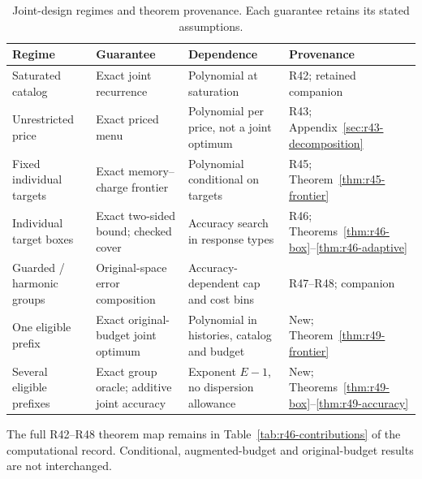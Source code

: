 \begin{table}[p]\centering
\caption{Joint-design regimes and theorem provenance. Each guarantee retains its stated assumptions.}\label{tab:r49-complexity}
\setlength{\tabcolsep}{3pt}
\begin{tabular}{p{}p{}p{}p{}}\toprule
Regime & Guarantee & Dependence & Provenance \\
\midrule
Saturated catalog & Exact joint recurrence & Polynomial at saturation & R42; retained companion \\
Unrestricted price & Exact priced menu & Polynomial per price, not a joint optimum & R43; Appendix~\ref{sec:r43-decomposition} \\
Fixed individual targets & Exact memory--charge frontier & Polynomial conditional on targets & R45; Theorem~\ref{thm:r45-frontier} \\
Individual target boxes & Exact two-sided bound; checked cover & Accuracy search in response types & R46; Theorems~\ref{thm:r46-box}--\ref{thm:r46-adaptive} \\
Guarded / harmonic groups & Original-space error composition & Accuracy-dependent cap and cost bins & R47--R48; companion \\
One eligible prefix & Exact original-budget joint optimum & Polynomial in histories, catalog and budget & New; Theorem~\ref{thm:r49-frontier} \\
Several eligible prefixes & Exact group oracle; additive joint accuracy & Exponent $E-1$, no dispersion allowance & New; Theorems~\ref{thm:r49-box}--\ref{thm:r49-accuracy} \\
\bottomrule\end{tabular}
\par\smallskip\begin{minipage}{.98\textwidth}The full R42--R48 theorem map remains in Table~\ref{tab:r46-contributions} of the computational record. Conditional, augmented-budget and original-budget results are not interchanged.\end{minipage}
\end{table}
